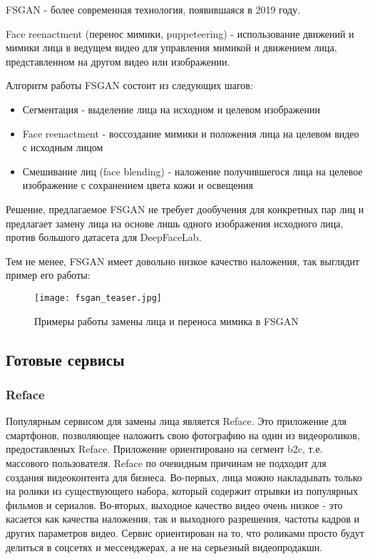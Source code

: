 FSGAN\cite{nirkin2019fsgan}\cite{nirkin2022fsganv2} - более современная технология, появившаяся в 2019 году.

Face reenactment (перенос мимики, puppeteering) - использование движений и мимики лица в ведущем видео для управления мимикой и движением лица, представленном на другом видео или изображении.

Алгоритм работы FSGAN состоит из следующих шагов:

\begin{itemize}
    \item Сегментация - выделение лица на исходном и целевом изображении
    \item Face reenactment - воссоздание мимики и положения лица на целевом видео с исходным лицом
    \item Смешивание лиц (face blending) - наложение получившегося лица на целевое изображение с сохранением цвета кожи и освещения
\end{itemize}

Решение, предлагаемое FSGAN не требует дообучения для конкретных пар лиц и предлагает замену лица на основе лишь одного изображения исходного лица, против большого датасета для DeepFaceLab.

Тем не менее, FSGAN имеет довольно низкое качество наложения, так выглядит пример его работы:

\begin{figure}[H]
    \centering
    \texttt{[image: fsgan\_teaser.jpg]}
    \caption{Примеры работы замены лица и переноса мимика в FSGAN} \label{fsgan_results}
\end{figure}

\subsection*{Готовые сервисы}

\subsubsection{Reface}

Популярным сервисом для замены лица является Reface. Это приложение для смартфонов, позволяющее наложить свою фотографию на один из видеороликов, предоставленых Reface.
Приложение ориентировано на сегмент b2c, т.е. массового пользователя. Reface по очевидным причинам не подходит для создания видеоконтента для бизнеса.
Во-первых, лица можно накладывать только на ролики из существующего набора, который содержит отрывки из популярных фильмов и сериалов.
Во-вторых, выходное качество видео очень низкое - это касается как качества наложения, так и выходного разрешения, частоты кадров и других параметров видео.
Сервис ориентирован на то, что роликами просто будут делиться в соцсетях и мессенджерах, а не на серьезный видеопродакшн.


